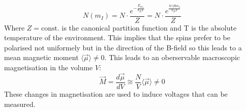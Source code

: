 			\begin{equation}
				N(m_I) = N \cdot \frac{e^{-\frac{E_{m_I}}{k_BT}}}{Z} = N \cdot \frac{e^{\frac{\hbar \gamma B m_I}{k_BT}}}{Z}
			\end{equation}
		Where $Z = \text{const.}$ is the canonical partition function and T is the absolute temperature of the environment. This implies that the spins prefer to be polarised not uniformely but in the direction of the B-field so this leads to a mean magnetic moment $\langle\vec{\mu}\rangle \neq 0$. This leads to an oberservable macroscopic magnetisation in the volume $V$:
			\begin{equation}
				\vec{M} = \frac{d\vec{\mu}}{dV} \cong \frac{N}{V} \langle\vec{\mu}\rangle \neq 0
			\end{equation}
		These changes in magnetisation are used to induce voltages that can be measured.
		

